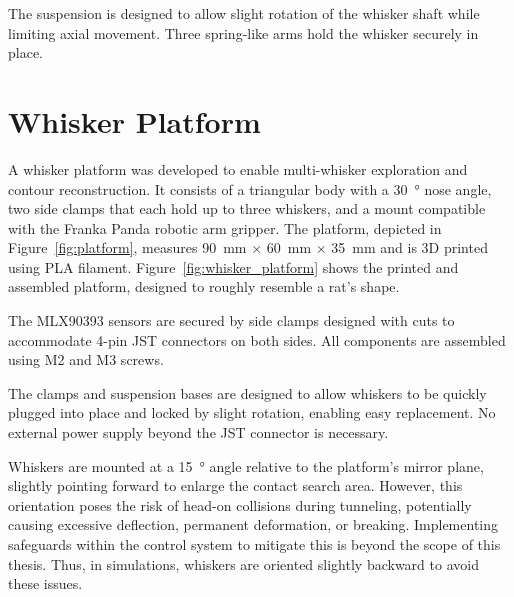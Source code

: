 The suspension is designed to allow slight rotation of the whisker shaft while limiting axial movement.
Three spring-like arms hold the whisker securely in place.


\section{Whisker Platform}

A whisker platform was developed to enable multi-whisker exploration and contour reconstruction.
It consists of a triangular body with a \SI{30}{\degree} nose angle, two side clamps that each hold up to three whiskers, and a mount compatible with the Franka Panda robotic arm gripper.
The platform, depicted in Figure~\ref{fig:platform}, measures \SI{90}{\milli\meter} $\times$ \SI{60}{\milli\meter} $\times$ \SI{35}{\milli\meter} and is 3D printed using PLA filament.
Figure~\ref{fig:whisker_platform} shows the printed and assembled platform, designed to roughly resemble a rat's shape.

The MLX90393 sensors are secured by side clamps designed with cuts to accommodate 4-pin JST connectors on both sides.
All components are assembled using M2 and M3 screws.

The clamps and suspension bases are designed to allow whiskers to be quickly plugged into place and locked by slight rotation, enabling easy replacement.
No external power supply beyond the JST connector is necessary.

Whiskers are mounted at a \SI{15}{\degree} angle relative to the platform's mirror plane, slightly pointing forward to enlarge the contact search area.
However, this orientation poses the risk of head-on collisions during tunneling, potentially causing excessive deflection, permanent deformation, or breaking.
Implementing safeguards within the control system to mitigate this is beyond the scope of this thesis.
Thus, in simulations, whiskers are oriented slightly backward to avoid these issues.

